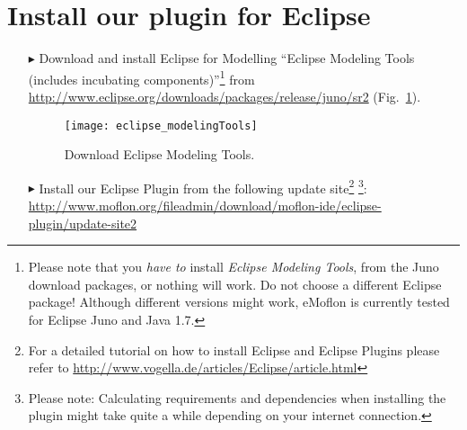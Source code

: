 \genHeader
{}

\section{Install our plugin for Eclipse}
 
 \vspace{0.5cm}
 
\begin{itemize}
\item[$\blacktriangleright$] Download and install Eclipse for Modelling ``Eclipse Modeling Tools (includes incubating components)''\footnote{Please note that you \emph{have to} install \emph{Eclipse Modeling Tools}, from the Juno download packages, or nothing will work.  Do not choose a different Eclipse package!  Although different versions might work, eMoflon is currently tested for Eclipse Juno and Java 1.7.} from \url{http://www.eclipse.org/downloads/packages/release/juno/sr2} (Fig.~\ref{fig_downloadModelingPackage}).

\vspace{1.5cm}

\begin{figure}[htbp]
	\centering
  	\texttt{[image: eclipse\_modelingTools]}
	\caption{Download Eclipse Modeling Tools.}
	\label{fig_downloadModelingPackage}
\end{figure}

\vspace{1cm}

\item[$\blacktriangleright$] Install our Eclipse Plugin from the following update site\footnote{For a detailed tutorial on how to install Eclipse and Eclipse Plugins please refer to \url{http://www.vogella.de/articles/Eclipse/article.html}} 
\footnote{Please note: Calculating requirements and dependencies when installing the plugin might take quite a while depending on your internet connection.}:
\url{http://www.moflon.org/fileadmin/download/moflon-ide/eclipse-plugin/update-site2}

\end{itemize}
